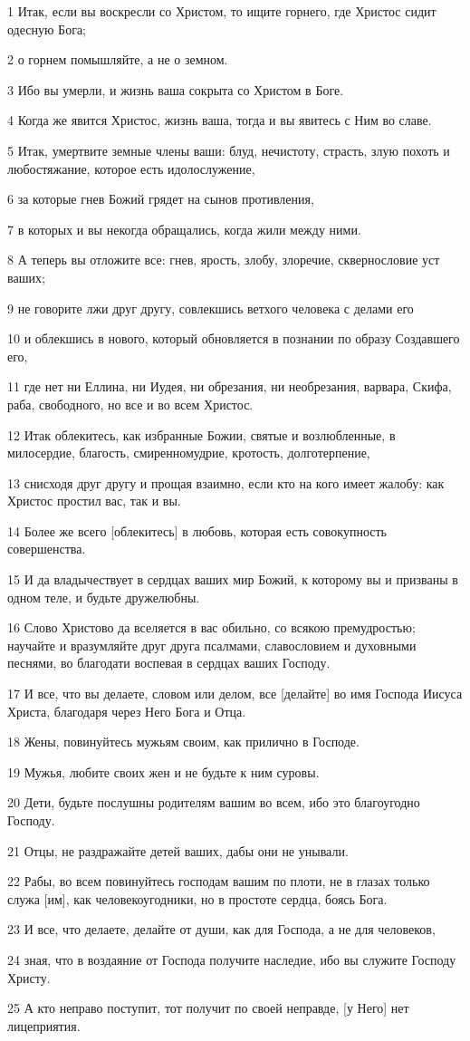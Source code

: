 \par 1 Итак, если вы воскресли со Христом, то ищите горнего, где Христос сидит одесную Бога;
\par 2 о горнем помышляйте, а не о земном.
\par 3 Ибо вы умерли, и жизнь ваша сокрыта со Христом в Боге.
\par 4 Когда же явится Христос, жизнь ваша, тогда и вы явитесь с Ним во славе.
\par 5 Итак, умертвите земные члены ваши: блуд, нечистоту, страсть, злую похоть и любостяжание, которое есть идолослужение,
\par 6 за которые гнев Божий грядет на сынов противления,
\par 7 в которых и вы некогда обращались, когда жили между ними.
\par 8 А теперь вы отложите все: гнев, ярость, злобу, злоречие, сквернословие уст ваших;
\par 9 не говорите лжи друг другу, совлекшись ветхого человека с делами его
\par 10 и облекшись в нового, который обновляется в познании по образу Создавшего его,
\par 11 где нет ни Еллина, ни Иудея, ни обрезания, ни необрезания, варвара, Скифа, раба, свободного, но все и во всем Христос.
\par 12 Итак облекитесь, как избранные Божии, святые и возлюбленные, в милосердие, благость, смиренномудрие, кротость, долготерпение,
\par 13 снисходя друг другу и прощая взаимно, если кто на кого имеет жалобу: как Христос простил вас, так и вы.
\par 14 Более же всего [облекитесь] в любовь, которая есть совокупность совершенства.
\par 15 И да владычествует в сердцах ваших мир Божий, к которому вы и призваны в одном теле, и будьте дружелюбны.
\par 16 Слово Христово да вселяется в вас обильно, со всякою премудростью; научайте и вразумляйте друг друга псалмами, славословием и духовными песнями, во благодати воспевая в сердцах ваших Господу.
\par 17 И все, что вы делаете, словом или делом, все [делайте] во имя Господа Иисуса Христа, благодаря через Него Бога и Отца.
\par 18 Жены, повинуйтесь мужьям своим, как прилично в Господе.
\par 19 Мужья, любите своих жен и не будьте к ним суровы.
\par 20 Дети, будьте послушны родителям вашим во всем, ибо это благоугодно Господу.
\par 21 Отцы, не раздражайте детей ваших, дабы они не унывали.
\par 22 Рабы, во всем повинуйтесь господам вашим по плоти, не в глазах только служа [им], как человекоугодники, но в простоте сердца, боясь Бога.
\par 23 И все, что делаете, делайте от души, как для Господа, а не для человеков,
\par 24 зная, что в воздаяние от Господа получите наследие, ибо вы служите Господу Христу.
\par 25 А кто неправо поступит, тот получит по своей неправде, [у Него] нет лицеприятия.

